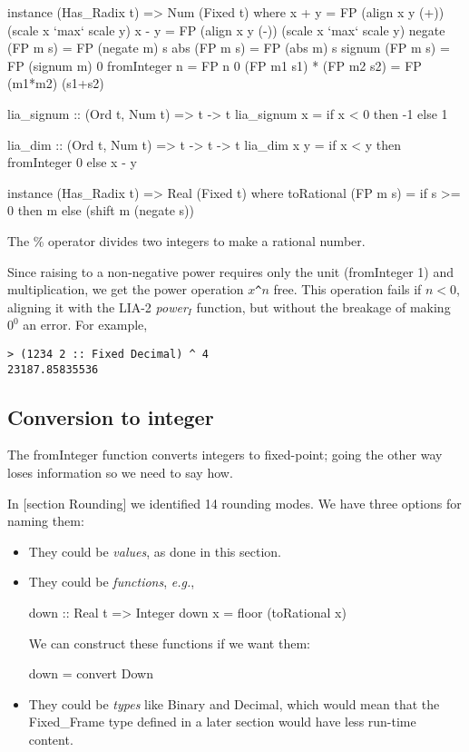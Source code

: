 \documentclass{article}
\begin{document}
\begin{code}
\begin{code}
instance (Has_Radix t) => Num (Fixed t)
  where
    x + y = FP (align x y (+)) (scale x `max` scale y)
    x - y = FP (align x y (-)) (scale x `max` scale y)
    negate (FP m s) = FP (negate m) s
    abs    (FP m s) = FP (abs    m) s
    signum (FP m s) = FP (signum m) 0
    fromInteger n   = FP n 0
    (FP m1 s1) * (FP m2 s2)  = FP (m1*m2) (s1+s2)

lia_signum :: (Ord t, Num t) => t -> t
lia_signum x = if x < 0 then -1 else 1

lia_dim :: (Ord t, Num t) => t -> t -> t
lia_dim x y = if x < y then fromInteger 0 else x - y

instance (Has_Radix t) => Real (Fixed t)
  where
    toRational (FP m s) =
      if s >= 0 then m %
      else (shift m (negate s)) %
\end{code}
The \% operator divides two integers to make a rational number.

Since raising to a non-negative power requires only the unit
(fromInteger 1) and multiplication, we get the power operation
$x$\verb|^|$n$ free.  This operation fails if $n<0$, aligning
it with the LIA-2 {\it power${}_I$} function, but without the
breakage of making $0^0$ an error.  For example,
\begin{verbatim}
> (1234 2 :: Fixed Decimal) ^ 4
23187.85835536
\end{verbatim}

\subsection{Conversion to integer}

The fromInteger function converts integers to fixed-point;
going the other way loses information so we need to say how.

In [section Rounding] we identified 14 rounding modes.
We have three options for naming them:
\begin{itemize}
\item They could be {\it values}, as done in this section.
\item They could be {\it functions}, {\it e.g.},
\begin{code}%
down :: Real t => Integer
down x = floor (toRational x)
\end{code}
We can construct these functions if we want them:
\begin{code}%
down = convert Down
\end{code}
\item They could be {\it types} like Binary and Decimal,
which would mean that the Fixed\_Frame type defined in a
later section would have less run-time content.
\end{itemize}


\end{code}
\end{document}
